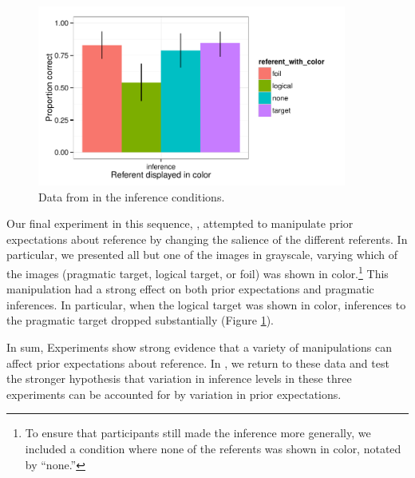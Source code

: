 \begin{figure}[t]
  \centering
  \includegraphics[width=4in]{../plots/2-prior-color.pdf}
  \caption{\label{fig:prior-color} Data from  in the inference conditions.}
\end{figure}

Our final experiment in this sequence, , attempted to manipulate prior expectations about reference by changing the salience of the different referents. In particular, we presented all but one of the images in grayscale, varying which of the images (pragmatic target, logical target, or foil) was shown in color.\footnote{To ensure that participants still made the inference more generally, we included a condition where none of the referents was shown in color, notated by ``none.''} This manipulation had a strong effect on both prior expectations and pragmatic inferences. In particular, when the logical target was shown in color, inferences to the pragmatic target dropped substantially (Figure \ref{fig:prior-color}). 

In sum, Experiments  show strong evidence that a variety of manipulations can affect prior expectations about reference. In , we return to these data and test the stronger hypothesis that variation in inference levels in these three experiments can be accounted for by variation in prior expectations. 
 